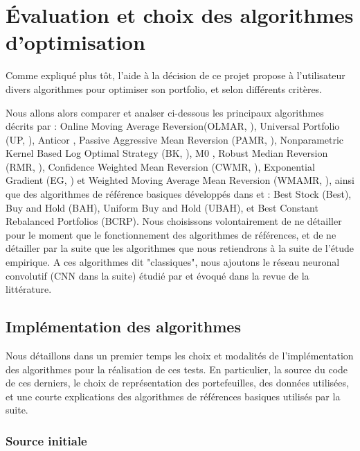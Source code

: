 \documentclass[a4paper, 10pt]{article}
\begin{document}
\newpage
\section{Évaluation et choix des algorithmes d'optimisation}
\label{sec:theorie}

Comme expliqué plus tôt, l'aide à la décision de ce projet propose à l'utilisateur divers algorithmes pour optimiser son portfolio, et selon différents critères. 

 Nous allons alors comparer et analser ci-dessous les principaux algorithmes décrits par \citet{Li2014} : Online Moving Average Reversion(OLMAR, \cite{Li2015}), Universal Portfolio (UP, \cite{Cover1991}), Anticor \cite{Borodin2004}, Passive Aggressive Mean Reversion (PAMR, \cite{Li2012}), Nonparametric Kernel Based Log Optimal Strategy (BK, \cite{Gyorfi2006}), M0 \cite{Borodin2000}, Robust Median Reversion (RMR, \cite{Huang2013}), Confidence Weighted Mean Reversion (CWMR, \cite{Li2013}), Exponential Gradient (EG, \cite{Helmbold1998}) et Weighted Moving Average Mean Reversion (WMAMR, \cite{Gao2013}), ainsi que des algorithmes de référence basiques développés dans \cite{Cover1991} et \cite{Cover1986} : Best Stock (Best), Buy and Hold (BAH), Uniform Buy and Hold (UBAH), et Best Constant Rebalanced Portfolios (BCRP). Nous choisissons volontairement de ne détailler pour le moment que le fonctionnement des algorithmes de références, et de ne détailler par la suite que les algorithmes que nous retiendrons à la suite de l'étude empirique. A ces algorithmes dit "classiques", nous ajoutons le réseau neuronal convolutif (CNN dans la suite) étudié par \citet{Jiang2017} et évoqué dans la revue de la littérature.

\subsection{Implémentation des algorithmes}
\label{sec:theorie_implem}

Nous détaillons dans un premier temps les choix et modalités de l'implémentation des algorithmes pour la réalisation de ces tests. En particulier, la source du code de ces derniers, le choix de représentation des portefeuilles, des données utilisées, et une courte explications des algorithmes de références basiques utilisés par la suite.

\subsubsection{Source initiale}
\label{sec:theorie_implem_source}
\end{document}
